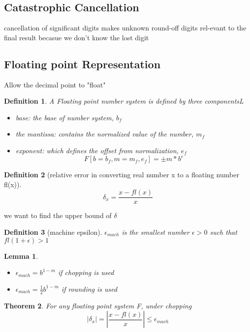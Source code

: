 \documentclass[10pt]{article}
\theoremstyle{break}
\newtheorem{thm}{Theorem}[subsection]
\newtheorem{lem}[thm]{Lemma}
\newtheorem{defn}{Definition}[subsection]
\begin{document}
{    \subsection{Catastrophic Cancellation}
    cancellation of significant digits makes unknown round-off digits rel-evant to the final result becasue we don’t know the lost digit
    \subsection{Floating point Representation}
        Allow the decimal point to "float"
        \begin{defn} A Floating point number system is defined by three componentsL
            \begin{itemize}
                \item base: the base of number system, $b_f$
                \item the mantissa: contains the normalized value of the number, $m_f$
                \item exponent: which defines the offset from normalization, $e_f$
                $$F[b=b_f,m=m_f,e_f]=\pm m * b ^e$$
            \end{itemize}
        \end{defn}
        \begin{defn}[relative error in converting real number x to a floating number fl(x)]
            $$\delta_x=\frac{x-fl(x)}{x}$$
        \end{defn}
        we want to find the upper bound of $\delta$
        \begin{defn}[machine epsilon]
            $\epsilon_{mach}$ is the smallest number $\epsilon >0$ such that $fl(1+\epsilon)>1$
        \end{defn}
        \begin{lem}
            \begin{itemize}
                \item $\epsilon_{mach}=b^{1-m}$ if chopping is used
                \item $\epsilon_{mach}=\frac{1}{2}b^{1-m}$ if rounding is used
            \end{itemize}
        \end{lem}
        \begin{thm}
            For any floating point system F, under chopping 
            $$|\delta_x|=|\frac{x-fl(x)}{x}|\leq \epsilon_{mach}$$
        \end{thm}
}
\end{document}
